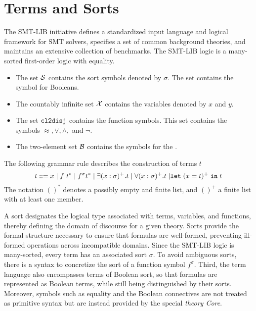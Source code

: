 \section{Terms and Sorts}

The SMT-LIB initiative \cite{smtlib} defines a standardized input language and logical framework for SMT solvers, specifies a set of common background theories, and maintains an extensive collection of benchmarks.
The SMT-LIB logic is a many-sorted first-order logic with equality.

\begin{itemize}
    \item The set $\cal{S}$ contains the sort symbols denoted by $\sigma$. The set contains the symbol  for Booleans.
    \item The countably infinite set $\cal{X}$ contains the variables denoted by $x$ and $y$.
    \item The set $\cltodisj$ contains the function symbols. This set contains the symbols $\approx, \lor, \land,$ and $\neg$.
    \item The two-element set $\cal{B}$ contains the symbols for the .
\end{itemize}


\begin{definition}[Terms]\label{def:smt-grammar}
The following grammar rule describes the construction of terms $t$
\begin{equation*}
t ::= x \pipe f~t^* \pipe f^\sigma t^* \pipe \exists (x: \sigma)^+. t \pipe \forall (x: \sigma)^+. t \pipe \mathrel{\kw{let}} (x = t)^+ \mathrel{\kw{in}} t
\end{equation*}
The notation $()^*$ denotes a possibly empty and finite list, and $()^+$ a finite list with at least one member.
\end{definition}

A sort designates the logical type associated with terms, variables, and functions, thereby defining the domain of discourse for a given theory.
Sorts provide the formal structure necessary to ensure that formulas are well-formed, preventing ill-formed operations across incompatible domains.
Since the SMT-LIB logic is many-sorted, every term has an associated sort $\sigma$.
To avoid ambiguous sorts, there is a syntax to concretize the sort of a function symbol $f^\sigma$.
Third, the term language also encompasses terms of Boolean sort, so that formulas are represented as Boolean terms, while still being distinguished by their sorts.
Moreover, symbols such as equality and the Boolean connectives are not treated as primitive syntax but are instead provided by the special \emph{theory Core}.

